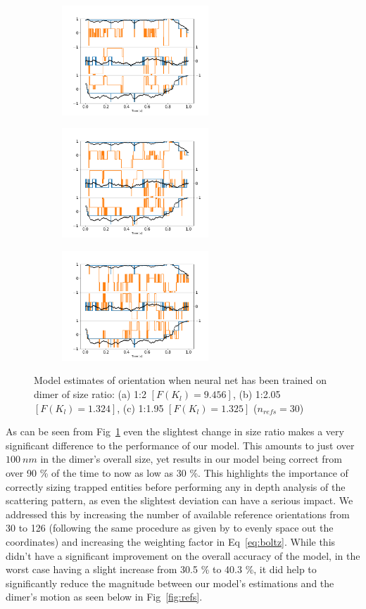 \documentclass[12pt]{spieman}
\begin{document}
\begin{spacing}{1.5}
\begin{figure}[h]
	\centering
	\begin{subfigure}{0.33\textwidth}
			\subcaption{}
			\includegraphics[width =5.5cm]{./Images/fig8a.png}
	\end{subfigure}
	\begin{subfigure}{0.31\textwidth}
		\subcaption{}
		\includegraphics[width=5.5cm]{./Images/fig8b.png}
	\end{subfigure}
	\begin{subfigure}{0.31\textwidth}
		\subcaption{}
		\includegraphics[width=5.5cm]{./Images/fig8c.png}
	\end{subfigure}
	\caption{Model estimates of orientation when neural net has been trained on dimer of size ratio: (a) 1:2 $[F(K_l)=9.456]$, (b) 1:2.05 $[F(K_l)=1.324]$, (c) 1:1.95 $[F(K_l)=1.325]$ ($n_{refs} = 30$)}
	\label{fig:size}
\end{figure}
As can be seen from Fig~\ref{fig:size}  even the slightest change in size ratio makes a very significant difference to the performance of our model. This amounts to just over $100 \ nm$ in the dimer's overall size, yet results in our model being correct from over 90 \% of the time to now as low as 30 \%. This highlights the importance of correctly sizing trapped entities before performing any in depth analysis of the scattering pattern, as even the slightest deviation can have a serious impact. We addressed this by increasing the number of available reference orientations from 30 to 126 (following the same procedure as given by \cite{Rey2006} to evenly space out the coordinates) and increasing the weighting factor in Eq~\ref{eq:boltz}. While this didn't have a significant improvement on the overall accuracy of the model, in the worst case having a slight increase from 30.5 \% to 40.3 \%, it did help to significantly reduce the magnitude between our model's estimations and the dimer's motion as seen below in Fig~\ref{fig:refs}.


\end{spacing}
\end{document}
